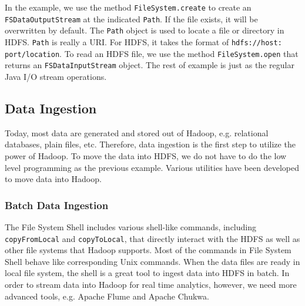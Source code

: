 \documentclass[11pt]{book}
\begin{document}
In the example, we use the method \texttt{FileSystem.create} to create an \texttt{FSDataOutputStream} at the indicated \texttt{Path}. If the file exists, it will be overwritten by default. The \texttt{Path} object is used to locate a file or directory in HDFS. \texttt{Path} is really a URI. For HDFS, it takes the format of \texttt{hdfs://host: port/location}. To read an HDFS file, we use the method \texttt{FileSystem.open} that returns an \texttt{FSDataInputStream} object. The rest of example is just as the regular Java I/O stream operations.

\subsection[Data Ingestion]
{Data Ingestion}

Today, most data are generated and stored out of Hadoop, e.g. relational databases, plain files, etc. Therefore, data ingestion is the first step to utilize the power of Hadoop. To move the data into HDFS, we do not have to do the low level programming as the previous example. Various utilities have been developed to move data into Hadoop.

\subsubsection{Batch Data Ingestion}
The File System Shell \cite{HdfsShell} includes various shell-like commands, including \texttt{copyFromLocal} and \texttt{copyToLocal}, that directly interact with the HDFS as well as other file systems that Hadoop supports. Most of the commands in File System Shell behave like corresponding Unix commands. When the data files are ready in local file system, the shell is a great tool to ingest data into HDFS in batch. In order to stream data into Hadoop for real time analytics, however, we need more advanced tools, e.g. Apache Flume and Apache Chukwa. 
\end{document}
